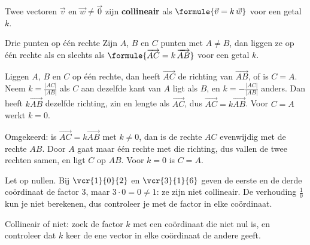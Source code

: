 \begin{theorie}
Twee vectoren $\vec v$ en $\vec w \neq \vec 0$ zijn \textbf{\textcolor{accent}{collineair}} als \quad $\formule{\vec v = k\,\vec w}$ \quad voor een getal $k$.
\begin{stelling}{Drie punten op één rechte}
Zijn $A$, $B$ en $C$ punten met $A \neq B$, dan liggen ze op één rechte als en slechts als $\formule{\overrightarrow{AC} = k\,\overrightarrow{AB}}$ voor een getal $k$.
\end{stelling}
\begin{bewijs}
Liggen $A$, $B$ en $C$ op één rechte, dan heeft $\overrightarrow{AC}$ de richting van $\overrightarrow{AB}$, of is $C = A$. Neem $k = \frac{|AC|}{|AB|}$ als $C$ aan dezelfde kant van $A$ ligt als $B$, en $k = -\frac{|AC|}{|AB|}$ anders. Dan heeft $k\overrightarrow{AB}$ dezelfde richting, zin en lengte als $\overrightarrow{AC}$, dus $\overrightarrow{AC} = k\overrightarrow{AB}$. Voor $C = A$ werkt $k = 0$.

Omgekeerd: is $\overrightarrow{AC} = k\overrightarrow{AB}$ met $k \neq 0$, dan is de rechte $AC$ evenwijdig met de rechte $AB$. Door $A$ gaat maar één rechte met die richting, dus vallen de twee rechten samen, en ligt $C$ op $AB$. Voor $k = 0$ is $C = A$.
\end{bewijs}
\end{theorie}


Let op nullen. Bij $\vcr{1}{0}{2}$ en $\vcr{3}{1}{6}$ geven de eerste en de derde coördinaat de factor $3$, maar $3 \cdot 0 = 0 \neq 1$: ze zijn niet collineair. De verhouding $\frac10$ kun je niet berekenen, dus controleer je met de factor in elke coördinaat.

\begin{werkwijze}
Collineair of niet: zoek de factor $k$ met een coördinaat die niet nul is, en controleer dat $k$ keer de ene vector in elke coördinaat de andere geeft.
\end{werkwijze}

